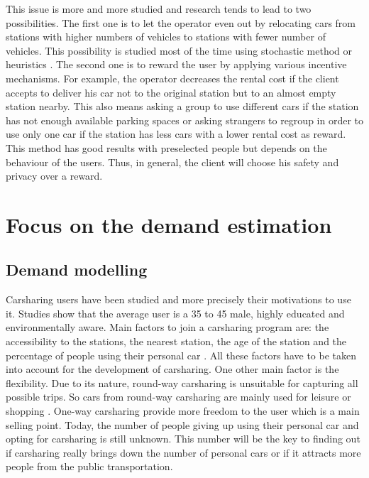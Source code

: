 \begin{bibunit}[ieeetr]
This issue is more and more studied and research tends to lead to two possibilities.
The first one is to let the operator even out by relocating cars from stations with higher numbers of vehicles to stations with fewer number of vehicles.
This possibility is studied most of the time using stochastic method \cite{fan_optimizing_2014} or heuristics \cite{duron_analysis_2000}.
The second one is to reward the user by applying various incentive mechanisms.
For example, the operator decreases the rental cost if the client accepts to deliver his car not to the original station but to an almost empty station nearby.
This also means asking a group to use different cars if the station has not enough available parking spaces or asking strangers to regroup in order to use only one car if the station has less cars with a lower rental cost as reward.
This method has good results with preselected people but depends on the behaviour of the users.
Thus, in general, the client will choose his safety and privacy over a reward.






\newpage
\section{Focus on the demand estimation}

\subsection{Demand modelling}
Carsharing users have been studied and more precisely their motivations to use it.
Studies show that the average user is a 35 to 45 male, highly educated and environmentally aware.
Main factors to join a carsharing program are: the accessibility to the stations, the nearest station, the age of the station and the percentage of people using their personal car \cite{jorge_carsharing_2013}.
All these factors have to be taken into account for the development of carsharing.
One other main factor is the flexibility.
Due to its nature, round-way carsharing is unsuitable for capturing all possible trips.
So cars from round-way carsharing are mainly used for leisure or shopping \cite{barth_shared_use_2002, costain_synopsis_2012}.
One-way carsharing provide more freedom to the user which is a main selling point.
Today, the number of people giving up using their personal car and opting for carsharing is still unknown.
This number will be the key to finding out if carsharing really brings down the number of personal cars or if it attracts more people from the public transportation.


\end{bibunit}
